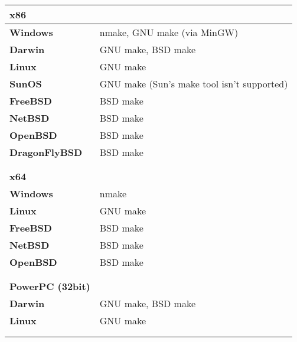 \begin{tabular}{l l}
{\bf{\large x86}} &                                            \\
\hline\hline
{\bf Windows}      & nmake, GNU make (via MinGW)               \\
{\bf Darwin}       & GNU make, BSD make                        \\
{\bf Linux}        & GNU make                                  \\
{\bf SunOS}        & GNU make (Sun's make tool isn't supported)\\
{\bf FreeBSD}      & BSD make                                  \\
{\bf NetBSD}       & BSD make                                  \\
{\bf OpenBSD}      & BSD make                                  \\
{\bf DragonFlyBSD} & BSD make                                  \\
\hline
                   &                                           \\
                   &                                           \\


{\bf{\large x64}}  &                                           \\
\hline\hline
{\bf Windows}      & nmake                                     \\
{\bf Linux}        & GNU make                                  \\
{\bf FreeBSD}      & BSD make                                  \\
{\bf NetBSD}       & BSD make                                  \\
{\bf OpenBSD}      & BSD make                                  \\
\hline
                   &                                           \\
                   &                                           \\


{\bf{\large PowerPC (32bit)}} &                                \\
\hline\hline
{\bf Darwin}       & GNU make, BSD make                        \\
{\bf Linux}        & GNU make                                  \\
\hline
                   &                                           \\
                   &                                           \\



\end{tabular}
